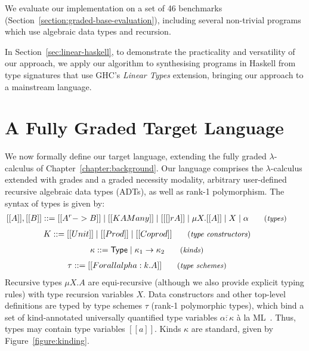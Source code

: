 We evaluate our implementation on a set of 46 benchmarks
(Section~\ref{section:graded-base-evaluation}), including several non-trivial
programs which use algebraic data types and recursion.

In Section~\ref{sec:linear-haskell}, to demonstrate the practicality and
versatility of our approach, we apply our algorithm to synthesising programs in
Haskell from type signatures that use GHC's \emph{Linear Types} extension,
bringing our approach to a mainstream language.

\section{A Fully Graded Target Language}
\label{section:graded-base-typing}

We now formally define our target language, extending the fully graded
$\lambda$-calculus of Chapter~\ref{chapter:background}. Our language comprises
the $\lambda$-calculus extended with grades and a graded necessity modality,
arbitrary user-defined recursive algebraic data types (ADTs), as well as rank-1
polymorphism. The syntax of types is given by:
\begin{align*}
    \hspace{-0.9em}[[ A ]] , [[ B ]] & ::=
           [[ A ^ r -> B ]]
      \mid [[ K {A Many} ]]
      \mid [[ [] r A ]]
      \mid \mu X . [[ A ]]
      \mid X
      \mid \alpha
    {\small{\tag{\textit{types}}}}
\end{align*}
\begin{align*}
  \vspace{-1em}
    \hspace{-0.9em} K & ::=
           [[ Unit ]]
      \mid [[ Prod ]]
      \mid [[ Coprod ]]
    {\small{\tag{\textit{type constructors}}}}
\end{align*}
\begin{align*}
  \vspace{-1em}
  \hspace{-0.9em} \kappa & ::= 
    \mathsf{Type}
    \mid \kappa_1 \rightarrow \kappa_2
    {\small{\tag{\textit{kinds}}}}
\end{align*}
\begin{align*}
  \vspace{-1em}
    \hspace{-0.9em} \tau & ::=
           [[ Forall alpha : k . A  ]]
    {\small{\tag{\textit{type schemes}}}}
\end{align*}
Recursive types $\mu X . A$ are equi-recursive (although we also provide
explicit typing rules) with type recursion variables $X$. Data constructors and
other top-level definitions are typed by type schemes $\tau$ (rank-1 polymorphic
types), which bind a set of kind-annotated universally quantified type variables
$\overline{\alpha : \kappa}$ à la ML~\citep{milner1978theory}. Thus,
types may contain type variables $[[ a ]]$. Kinds $\kappa$ are standard, given
by Figure~\ref{figure:kinding}.

